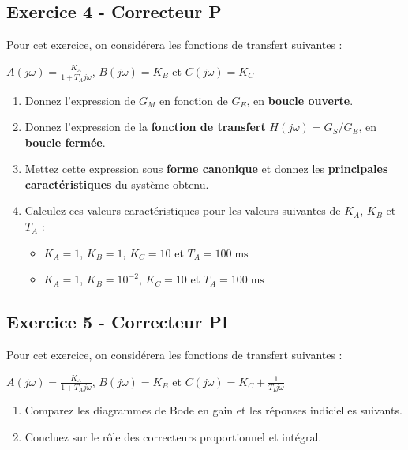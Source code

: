 \documentclass[a4paper,11pt,twoside]{book} %
\begin{document}
\subsection{Exercice 4 - Correcteur P}

Pour cet exercice, on considérera les fonctions de transfert suivantes : 

$A(j \omega) = \frac{K_A}{1 + T_A j \omega}$, $B(j \omega) = K_B$ et $C(j \omega) = K_C$ 

\begin{enumerate}
	\item Donnez l'expression de $G_M$ en fonction de $G_E$, en \textbf{boucle ouverte}.
		
	\item Donnez l'expression de la \textbf{fonction de transfert} $H(j \omega) = G_S / G_E$, en \textbf{boucle fermée}.
	\item Mettez cette expression sous \textbf{forme canonique} et donnez les \textbf{principales caractéristiques} du système obtenu.
	\item Calculez ces valeurs caractéristiques pour les valeurs suivantes de $K_A$, $K_B$ et $T_A$ :
	\begin{itemize}
		\item $K_A = 1$, $K_B = 1$, $K_C = 10$ et $T_A = 100\operatorname{ms}$
		\item $K_A = 1$, $K_B = 10^{-2}$, $K_C = 10$ et $T_A = 100\operatorname{ms}$
	\end{itemize}
\end{enumerate}



\subsection{Exercice 5 - Correcteur PI}

Pour cet exercice, on considérera les fonctions de transfert suivantes : 

$A(j \omega) = \frac{K_A}{1 + T_A j \omega}$, $B(j \omega) = K_B$ et $C(j \omega) = K_C + \frac{1}{T_I j \omega}$ 

\bigskip

\begin{enumerate}
	\item Comparez les diagrammes de Bode en gain et les réponses indicielles suivants.
	\item Concluez sur le rôle des correcteurs proportionnel et intégral.
\end{enumerate}
\end{document}
